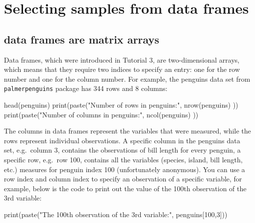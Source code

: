 \documentclass[
  letterpaper,
  DIV=11,
  numbers=noendperiod]{scrreprt}
\newenvironment{Shaded}{\begin{snugshade}}{\end{snugshade}}
\newcommand{\NormalTok}[1]{\textcolor[rgb]{0.00,0.23,0.31}{#1}}
\begin{document}
\hypertarget{selecting-samples-from-data-frames}{%
\section*{Selecting samples from data
frames}\label{selecting-samples-from-data-frames}}


\hypertarget{data-frames-are-matrix-arrays}{%
\subsection*{data frames are matrix
arrays}\label{data-frames-are-matrix-arrays}}

Data frames, which were introduced in Tutorial 3, are two-dimensional
arrays, which means that they require two indices to specify an entry:
one for the row number and one for the column number. For example, the
penguins data set from \texttt{palmerpenguins} package has 344 rows and
8 columns:

\begin{Shaded}
\begin{Highlighting}[]
\NormalTok{head(penguins)}
\NormalTok{print(paste("Number of rows in penguins:", nrow(penguins) ))}
\NormalTok{print(paste("Number of columns in penguins:", ncol(penguins) ))  }
\end{Highlighting}
\end{Shaded}

The columns in data frames represent the variables that were measured,
while the rows represent individual observations. A specific column in
the penguins data set, e.g.~column 3, contains the observations of bill
length for every penguin, a specific row, e.g.~row 100, contains all the
variables (species, island, bill length, etc.) measures for penguin
index 100 (unfortunately anonymous). You can use a row index and column
index to specify an observation of a specific variable, for example,
below is the code to print out the value of the 100th observation of the
3rd variable:

\begin{Shaded}
\begin{Highlighting}[]
\NormalTok{print(paste("The 100th observation of the 3rd variable:", penguins[100,3]))}
\end{Highlighting}
\end{Shaded}
\end{document}

